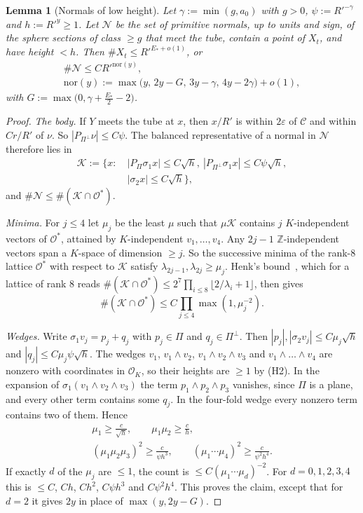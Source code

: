 \documentclass[aps,prx,twocolumn,superscriptaddress,nofootinbib,longbibliography]{revtex4-2}
\theoremstyle{plain}
\newtheorem{lemma}{Lemma}
\theoremstyle{definition}
\theoremstyle{remark}
\newcommand{\Z}{\mathbb{Z}}
\begin{document}
\begin{lemma}[Normals of low height]\label{lem:F5}
Let $\gamma:=\min(g,a_0)$ with $g>0$, $\psi:=R'^{-\gamma}$ and $h:=R'^y\ge1$. Let $\mathcal N$ be the set of primitive normals, up to units and sign, of the sphere sections of class $\ge g$ that meet the tube, contain a point of $X_t$, and have height $<h$. Then $\#X_t\le R'^{E_*+o(1)}$, or
\[
\begin{gathered}
\#\mathcal N\le CR'^{\mathrm{nor}(y)},\\
\mathrm{nor}(y):=\max\big(y,\,2y-G,\,3y-\gamma,\,4y-2\gamma\big)+o(1),
\end{gathered}
\]
with $G:=\max\big(0,\gamma+\tfrac{E_*}2-2\big)$.
\end{lemma}
\begin{proof}
\emph{The body.} If $Y$ meets the tube at $x$, then $x/R'$ is within $2\varepsilon$ of $\mathcal C$ and within $Cr/R'$ of $\nu$. So $|P_{\Pi^\perp}\nu|\le C\psi$. The balanced representative of a normal in $\mathcal N$ therefore lies in
\[
\begin{aligned}
\mathcal K:=\{x:\ &|P_\Pi\sigma_1x|\le C\sqrt h,\ |P_{\Pi^\perp}\sigma_1x|\le C\psi\sqrt h,\\ &|\sigma_2x|\le C\sqrt h\},
\end{aligned}
\]
and $\#\mathcal N\le\#(\mathcal K\cap\mathcal O^*)$.

\emph{Minima.} For $j\le4$ let $\mu_j$ be the least $\mu$ such that $\mu\mathcal K$ contains $j$ $K$-independent vectors of $\mathcal O^*$, attained by $K$-independent $v_1,\dots,v_4$. Any $2j-1$ $\Z$-independent vectors span a $K$-space of dimension $\ge j$. So the successive minima of the rank-$8$ lattice $\mathcal O^*$ with respect to $\mathcal K$ satisfy $\lambda_{2j-1},\lambda_{2j}\ge\mu_j$. Henk's bound~\cite{Henk}, which for a lattice of rank $8$ reads $\#(\mathcal K\cap\mathcal O^*)\le2^{7}\prod_{i\le8}\lfloor2/\lambda_i+1\rfloor$, then gives
\[
\#(\mathcal K\cap\mathcal O^*)\le C\prod_{j\le4}\max(1,\mu_j^{-2}).
\]

\emph{Wedges.} Write $\sigma_1v_j=p_j+q_j$ with $p_j\in\Pi$ and $q_j\in\Pi^\perp$. Then $|p_j|,|\sigma_2v_j|\le C\mu_j\sqrt h$ and $|q_j|\le C\mu_j\psi\sqrt h$. The wedges $v_1$, $v_1\wedge v_2$, $v_1\wedge v_2\wedge v_3$ and $v_1\wedge\dots\wedge v_4$ are nonzero with coordinates in $\mathcal O_K$, so their heights are $\ge1$ by (H2). In the expansion of $\sigma_1(v_1\wedge v_2\wedge v_3)$ the term $p_1\wedge p_2\wedge p_3$ vanishes, since $\Pi$ is a plane, and every other term contains some $q_j$. In the four-fold wedge every nonzero term contains two of them. Hence
\[
\begin{gathered}
\mu_1\ge\frac c{\sqrt h},\qquad \mu_1\mu_2\ge\frac ch,\\
(\mu_1\mu_2\mu_3)^2\ge\frac c{\psi h^3},\qquad (\mu_1\cdots\mu_4)^2\ge\frac c{\psi^2h^4}.
\end{gathered}
\]
If exactly $d$ of the $\mu_j$ are $\le1$, the count is $\le C(\mu_1\cdots\mu_d)^{-2}$. For $d=0,1,2,3,4$ this is $\le C$, $Ch$, $Ch^2$, $C\psi h^3$ and $C\psi^2h^4$. This proves the claim, except that for $d=2$ it gives $2y$ in place of $\max(y,2y-G)$.


\end{proof}
\end{document}
